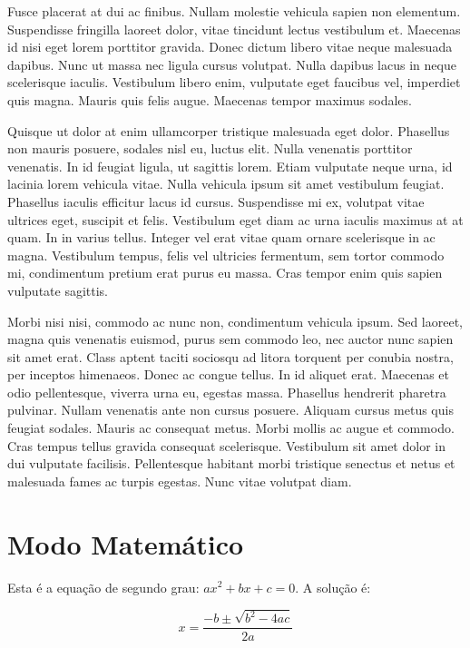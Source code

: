 \documentclass{article}
\begin{document}
	Fusce placerat at dui ac finibus. Nullam molestie vehicula sapien non elementum. Suspendisse fringilla laoreet dolor, vitae tincidunt lectus vestibulum et. Maecenas id nisi eget lorem porttitor gravida. Donec dictum libero vitae neque malesuada dapibus. Nunc ut massa nec ligula cursus volutpat. Nulla dapibus lacus in neque scelerisque iaculis. Vestibulum libero enim, vulputate eget faucibus vel, imperdiet quis magna. Mauris quis felis augue. Maecenas tempor maximus sodales.
	
	Quisque ut dolor at enim ullamcorper tristique malesuada eget dolor. Phasellus non mauris posuere, sodales nisl eu, luctus elit. Nulla venenatis porttitor venenatis. In id feugiat ligula, ut sagittis lorem. Etiam vulputate neque urna, id lacinia lorem vehicula vitae. Nulla vehicula ipsum sit amet vestibulum feugiat. Phasellus iaculis efficitur lacus id cursus. Suspendisse mi ex, volutpat vitae ultrices eget, suscipit et felis. Vestibulum eget diam ac urna iaculis maximus at at quam. In in varius tellus. Integer vel erat vitae quam ornare scelerisque in ac magna. Vestibulum tempus, felis vel ultricies fermentum, sem tortor commodo mi, condimentum pretium erat purus eu massa. Cras tempor enim quis sapien vulputate sagittis.
	
	Morbi nisi nisi, commodo ac nunc non, condimentum vehicula ipsum. Sed laoreet, magna quis venenatis euismod, purus sem commodo leo, nec auctor nunc sapien sit amet erat. Class aptent taciti sociosqu ad litora torquent per conubia nostra, per inceptos himenaeos. Donec ac congue tellus. In id aliquet erat. Maecenas et odio pellentesque, viverra urna eu, egestas massa. Phasellus hendrerit pharetra pulvinar. Nullam venenatis ante non cursus posuere. Aliquam cursus metus quis feugiat sodales. Mauris ac consequat metus. Morbi mollis ac augue et commodo. Cras tempus tellus gravida consequat scelerisque. Vestibulum sit amet dolor in dui vulputate facilisis. Pellentesque habitant morbi tristique senectus et netus et malesuada fames ac turpis egestas. Nunc vitae volutpat diam.
	
	\section{Modo Matemático}
	
	Esta é a equação de segundo grau: $ ax^2 + bx + c = 0 $. A solução é:
	
	\begin{equation}
		x = \frac{-b \pm \sqrt{b^2-4ac}}{2a}
	\end{equation}
	
\end{document}
